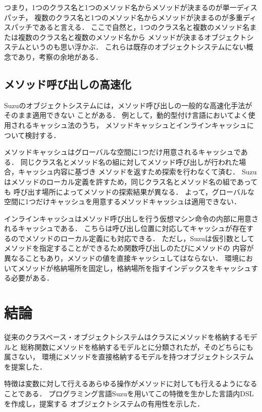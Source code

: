 \documentclass{ipsjprosym}
\begin{document}
つまり，1つのクラス名と1つのメソッド名からメソッドが決まるのが単一ディスパッチ，
複数のクラス名と1つのメソッド名からメソッドが決まるのが多重ディスパッチであると言える．
ここで自然と，1つのクラス名と複数のメソッド名または複数のクラス名と複数のメソッド名から
メソッドが決まるオブジェクトシステムというのも思い浮かぶ．
これらは既存のオブジェクトシステムにない概念であり，考察の余地がある．

\subsection{メソッド呼び出しの高速化}

Suzuのオブジェクトシステムには，メソッド呼び出しの一般的な高速化手法がそのまま適用できない
ことがある．
例として，動的型付け言語においてよく使用されるキャッシュ法\cite{Onodera:1997-04-15}のうち，
メソッドキャッシュとインラインキャッシュについて検討する．

メソッドキャッシュはグローバルな空間に1つだけ用意されるキャッシュである．
同じクラス名とメソッド名の組に対してメソッド呼び出しが行われた場合，キャッシュ内容に基づき
メソッドを返すため探索を行わなくて済む．
Suzuはメソッドのローカル定義を許すため，同じクラス名とメソッド名の組であっても
呼び出す場所によってメソッドの探索結果が異なる．
よって，グローバルな空間に1つだけキャッシュを用意するメソッドキャッシュは適用できない．

インラインキャッシュはメソッド呼び出しを行う仮想マシン命令の内部に用意されるキャッシュである．
こちらは呼び出し位置に対応してキャッシュが存在するのでメソッドのローカル定義にも対応できる．
ただし，Suzuは仮引数としてメソッドを指定することができるため関数呼び出しのたびにメソッドの
内容が異なることもあり，メソッドの値を直接キャッシュしてはならない．
環境においてメソッドが格納場所を固定し，格納場所を指すインデックスをキャッシュする必要がある．

\section{結論}

従来のクラスベース・オブジェクトシステムはクラスにメソッドを格納するモデルと
総称関数にメソッドを格納するモデルとに分類されたが，そのどちらにも属さない，
環境にメソッドを直接格納するモデルを持つオブジェクトシステムを提案した．

特徴は変数に対して行えるあらゆる操作がメソッドに対しても行えるようになることである．
プログラミング言語Suzuを用いてこの特徴を生かした言語内DSLを作成し，提案する
オブジェクトシステムの有用性を示した．
\end{document}
